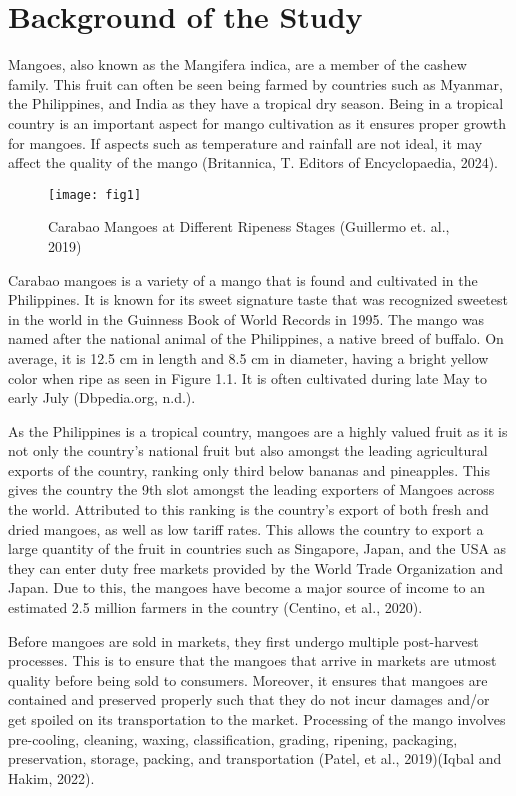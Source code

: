 \section{Background of the Study}

Mangoes, also known as the Mangifera indica, are a member of the cashew family. 
This fruit can often be seen being farmed by countries such as Myanmar, the Philippines, 
and India as they have a tropical dry season. Being in a tropical country is an important 
aspect for mango cultivation as it ensures proper growth for mangoes. 
If aspects such as temperature and rainfall are not ideal, it may affect the quality 
of the mango (Britannica, T. Editors of Encyclopaedia, 2024). 
\begin{figure}[!htbp]
	\centering
		\texttt{[image: fig1]}
	\caption{Carabao Mangoes at Different Ripeness Stages (Guillermo et. al., 2019)}
	\label{fig:img1}
\end{figure}
Carabao mangoes is a variety of a mango that is found and cultivated in the Philippines. It is known for its sweet signature taste that was recognized sweetest in the world in the Guinness Book of World Records in 1995. The mango was named after the national animal of the Philippines, a native breed of buffalo. On average, it is 12.5 cm in length and 8.5 cm in diameter, having a bright yellow color when ripe as seen in Figure 1.1. It is often cultivated during late May to early July (Dbpedia.org, n.d.).

As the Philippines is a tropical country, mangoes are a highly valued fruit as it is not only the country’s national fruit but also amongst the leading agricultural exports of the country, ranking only third below bananas and pineapples. This gives the country the 9th slot amongst the leading exporters of Mangoes across the world. Attributed to this ranking is the country's export of both fresh and dried mangoes, as well as low tariff rates. This allows the country to export a large quantity of the fruit in countries such as Singapore, Japan, and the USA as they can enter duty free markets provided by the World Trade Organization and Japan. Due to this, the mangoes have become a major source of income to an estimated 2.5 million farmers in the country (Centino, et al., 2020).

Before mangoes are sold in markets, they first undergo multiple post-harvest processes. This is to ensure that the mangoes that arrive in markets are utmost quality before being sold to consumers. Moreover, it ensures that mangoes are contained and preserved properly such that they do not incur damages and/or get spoiled on its transportation to the market. Processing of the mango involves pre-cooling, cleaning, waxing, classification, grading, ripening, packaging, preservation, storage, packing, and transportation (Patel, et al., 2019)(Iqbal and Hakim, 2022).

